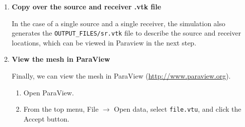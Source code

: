\documentclass[oneside,english]{book}
\newenvironment{lyxcode}
{\begin{list}{}{
\setlength{\rightmargin}{\leftmargin}
\setlength{\listparindent}{0pt}%
\raggedright
\setlength{\itemsep}{0pt}
\setlength{\parsep}{0pt}
\normalfont\ttfamily}%
 \item[]}
{\end{list}}
\newcommand{\urlwithparentheses}[1]{(\url{#1})}
\begin{document}
\begin{enumerate}
\item \textbf{Copy over the source and receiver .vtk file}


In the case of a single source and a single receiver, the simulation
also generates the \texttt{OUTPUT\_FILES/sr.vtk} file to describe
the source and receiver locations, which can be viewed in Paraview
in the next step.

\item \textbf{View the mesh in ParaView}


Finally, we can view the mesh in ParaView \urlwithparentheses{http://www.paraview.org}.

\begin{enumerate}
\item Open ParaView.
\item From the top menu, \textsf{File} $\rightarrow$\textsf{ Open data},
select \texttt{file.vtu}, and click the \textsf{Accept} button.


\end{enumerate}
\end{enumerate}
\end{document}
